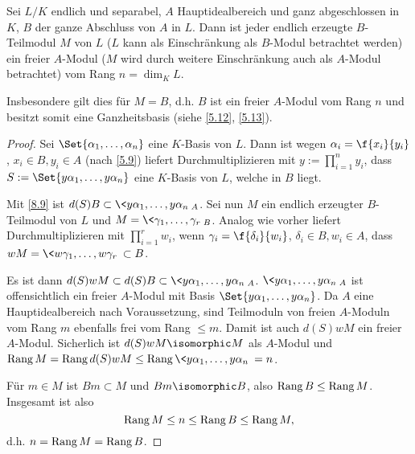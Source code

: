 \begin{st} \label{8.10}
	Sei $L / K$ endlich und separabel, $A$ Hauptidealbereich und ganz abgeschlossen in $K$, $B$ der ganze Abschluss von $A$ in $L$.
	Dann ist jeder endlich erzeugte $B$-Teilmodul $M$ von $L$ ($L$ kann als Einschränkung als $B$-Modul betrachtet werden) ein freier $A$-Modul ($M$ wird durch weitere Einschränkung auch als $A$-Modul betrachtet) vom Rang $n = \dim_K L$.

	Insbesondere gilt dies für $M = B$, d.h. $B$ ist ein freier $A$-Modul vom Rang $n$ und besitzt somit eine Ganzheitsbasis (siehe \ref{5.12}, \ref{5.13}).
	\begin{proof}
		Sei $\Set{\alpha_1, \dotsc, \alpha_n}$ eine $K$-Basis von $L$.
		Dann ist wegen $\alpha_i = \f{x_i}{y_i}$, $x_i \in B, y_i \in A$ (nach \ref{5.9}) liefert Durchmultiplizieren mit $y := \prod_{i=1}^n y_i$, dass $S := \Set{y\alpha_1, \dotsc, y\alpha_n}$ eine $K$-Basis von $L$, welche in $B$ liegt.

		Mit \ref{8.9} ist $d(S)B \subset \<y\alpha_1, \dotsc, y\alpha_n\>_A$.
		Sei nun $M$ ein endlich erzeugter $B$-Teilmodul von $L$ und $M = \< \gamma_1, \dotsc, \gamma_r \>_B$.
		Analog wie vorher liefert Durchmultiplizieren mit $\prod_{i=1}^r w_i$, wenn $\gamma_i = \f {\delta_i}{w_i}$, $\delta_i \in B, w_i \in A$, dass $wM = \<w\gamma_1, \dotsc, w\gamma_r\> \subset B$.

		Es ist dann $d(S) w M \subset d(S) B \subset \<y \alpha_1, \dotsc, y \alpha_n\>_A$.
		$\<y\alpha_1, \dotsc, y \alpha_n\>_A$ ist offensichtlich ein freier $A$-Modul mit Basis $\Set{y\alpha_1, \dotsc, y\alpha_n}$.
		Da $A$ eine Hauptidealbereich nach Voraussetzung, sind Teilmoduln von freien $A$-Moduln vom Rang $m$ ebenfalls frei vom Rang $\le m$.
		Damit ist auch $d(S) w M$ ein freier $A$-Modul.
		Sicherlich ist $d(S) w M \isomorphic M$ als $A$-Modul und $\Rang M = \Rang d(S) w M \le \Rang \<y\alpha_1, \dotsc, y\alpha_n \> = n$.

		Für $m \in M$ ist $Bm \subset M$ und $Bm \isomorphic B$, also $\operatorname{Rang} B \le \operatorname{Rang} M$.
		Insgesamt ist also
		\[
			\operatorname{Rang} M \le n \le \operatorname{Rang} B \le \operatorname{Rang} M,
		\]
		d.h. $n = \operatorname{Rang} M = \operatorname{Rang} B$.
	\end{proof}
\end{st}

